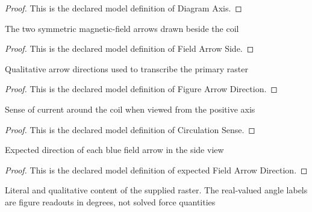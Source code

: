 \begin{proof}
  This is the declared model definition of Diagram Axis.
\end{proof}
\begin{definition}
  \label{def:physics:phyx-mini-0950:phyxminiproblems-problemphyxmini0950-fieldarrowside}
  The two symmetric magnetic-field arrows drawn beside the coil
\end{definition}
\begin{proof}
  This is the declared model definition of Field Arrow Side.
\end{proof}
\begin{definition}
  \label{def:physics:phyx-mini-0950:phyxminiproblems-problemphyxmini0950-figurearrowdirection}
  Qualitative arrow directions used to transcribe the primary raster
\end{definition}
\begin{proof}
  This is the declared model definition of Figure Arrow Direction.
\end{proof}
\begin{definition}
  \label{def:physics:phyx-mini-0950:phyxminiproblems-problemphyxmini0950-circulationsense}
  Sense of current around the coil when viewed from the positive axis
\end{definition}
\begin{proof}
  This is the declared model definition of Circulation Sense.
\end{proof}
\begin{definition}
  \label{def:physics:phyx-mini-0950:phyxminiproblems-problemphyxmini0950-expectedfieldarrowdirection}
  Expected direction of each blue field arrow in the side view
\end{definition}
\begin{proof}
  This is the declared model definition of expected Field Arrow Direction.
\end{proof}
\begin{definition}
  \label{def:physics:phyx-mini-0950:phyxminiproblems-problemphyxmini0950-voicecoilfigure}
  Literal and qualitative content of the supplied raster. The real-valued angle labels are figure readouts in degrees, not solved force quantities
\end{definition}
